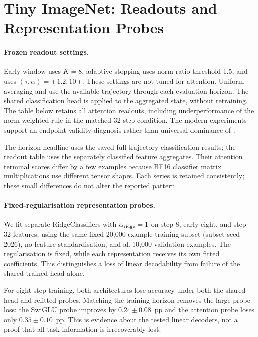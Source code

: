 \section{Tiny ImageNet: Readouts and Representation Probes}
\label{app:modern_readouts}

\paragraph{Frozen readout settings.}
Early-window uses $K=8$, adaptive stopping uses norm-ratio threshold 1.5,
and \grace{} uses $(\tau,\alpha)=(1.2,10)$. These settings are not tuned for
attention. Uniform averaging and \grace{} use the available trajectory through
each evaluation horizon. The shared classification head is applied to the
aggregated state, without retraining. The table below retains all attention
readouts, including underperformance of the norm-weighted rule in the matched
32-step condition. The modern experiments support an endpoint-validity
diagnosis rather than universal dominance of \grace{}.



The horizon headline uses the saved full-trajectory classification results;
the readout table uses the separately classified feature aggregates. Their
attention terminal scores differ by a few examples because BF16 classifier
matrix multiplications use different tensor shapes. Each series is retained
consistently; these small differences do not alter the reported pattern.

\paragraph{Fixed-regularisation representation probes.}
We fit separate RidgeClassifiers with $\alpha_{\rm ridge}=1$ on step-8,
early-eight, and step-32 features, using the same fixed 20,000-example
training subset (subset seed 2026), no feature standardisation, and all
10,000 validation examples. The regularisation is fixed, while each
representation receives its own fitted coefficients. This distinguishes a
loss of linear decodability from failure of the shared trained head alone.



For eight-step training, both architectures lose accuracy under both the
shared head and refitted probes. Matching the training horizon removes the
large probe loss: the SwiGLU probe improves by $0.24\pm0.08$~pp and the
attention probe loses only $0.35\pm0.10$~pp. This is evidence about the tested
linear decoders, not a proof that all task information is irrecoverably lost.

